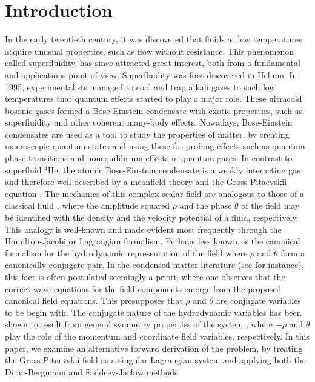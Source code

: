 \documentclass[twocolumn, nofootinbib, nobibnotes, amsmath,amssymb,aps, pra, floatfix]{revtex4-1}
\begin{document}
\section{Introduction}
In the early twentieth century, it was discovered that fluids at low temperatures acquire unusual properties, such as flow without resistance. 
This phenomenon called superfluidity, has since attracted great interest, both from a fundamental and applications point of view. 
Superfluidity was first discovered in Helium. 
In 1995, experimentalists managed to cool and trap alkali gases \cite{anderson1995observation,davis1995bose,bradley1995evidence} to such low temperatures that quantum effects started to play a major role. 
These ultracold bosonic gases formed a Bose-Einstein condensate with exotic properties, such as superfluidity and other coherent many-body effects. 
Nowadays, Bose-Einstein condensates are used as a tool to study the properties of matter, by creating macroscopic quantum states and using these for probing effects such as quantum phase transitions and nonequilibrium effects in quantum gases. 
In contrast to superfluid $^4$He, the atomic Bose-Einstein condensate is a weakly interacting gas and therefore well described by a meanfield theory and the Gross-Pitaevskii equation \cite{pitaevskii2016bose}. 
The mechanics of this complex scalar field are analogous to those of a classical fluid \cite{Madelung1926}, where the amplitude squared $\rho$ and the phase $\theta$ of the field may be identified with the density and the velocity potential of a fluid, respectively.
This analogy is well-known and made evident most frequently through the Hamilton-Jacobi or Lagrangian formalism.
Perhaps less known, is the canonical formalism for the hydrodynamic representation of the field where $\rho$ and $\theta$ form a canonically conjugate pair.
In the condensed matter literature (see \cite{london1954superfluids,pethick2002bose,pitaevskii2016bose,zakharov1974hamiltonian,zakh1997hamiltonian,PhysRevLett.105.095302} for instance), this fact is often postulated seemingly a priori, where one observes that the correct wave equations for the field components emerge from the proposed canonical field equations.
This presupposes that $\rho$ and $\theta$ are conjugate variables to be begin with.
The conjugate nature of the hydrodynamic variables has been shown to result from general symmetry properties of the system \cite{pokrovskii1976hamiltonian,khalatnikov1978canonical,khalatnikov1991hydrodynamics}, where $-\rho$ and $\theta$ play the role of the momentum and coordinate field variables, respectively.
In this paper, we examine an alternative forward derivation of the problem, by treating the Gross-Pitaevskii field as a singular Lagrangian system and applying both the Dirac-Bergmann and Faddeev-Jackiw methods.
\end{document}
